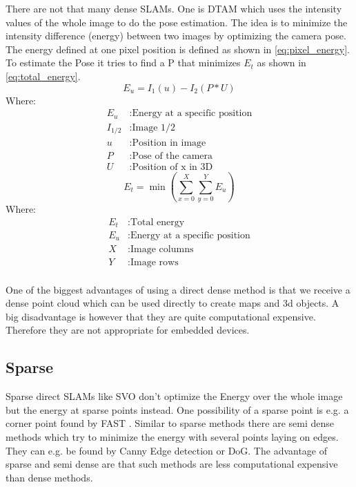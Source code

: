 \documentclass[11pt,a4paper,titlepage,oneside]{report}
\begin{document}
There are not that many dense SLAMs. One is DTAM \cite{dtam} which uses the intensity values of the whole image to do the pose estimation. The idea is to minimize the intensity difference (energy) between two images by optimizing the camera pose. The energy defined at one pixel position is defined as shown in \ref{eq:pixel_energy}. To estimate the Pose it tries to find a P that minimizes $E_{t}$ as shown in \ref{eq:total_energy}.
\begin{equation}\label{eq:pixel_energy}
  E_{u}=I_1(u)-I_2(P*U)
\end{equation}
Where:
\begin{align*}
  E_{u}		&: \text{Energy at a specific position}\\
  I_{1/2}	&: \text{Image 1/2}\\
  u		&: \text{Position in image} \\
  P		&: \text{Pose of the camera} \\
  U		&: \text{Position of x in 3D}
\end{align*}
\begin{equation}\label{eq:total_energy}
  E_{t}=\min(\sum_{x=0}^X\sum_{y=0}^YE_u)
\end{equation}
Where:
\begin{align*}
  E_{t}		&: \text{Total energy}\\
  E_{u}		&: \text{Energy at a specific position}\\
	X				&: \text{Image columns}\\
	Y				&: \text{Image rows}\\
\end{align*}


One of the biggest advantages of using a direct dense method is that we receive a dense point cloud which can be used directly to create maps and 3d objects. A big disadvantage is however that they are quite computational expensive. Therefore they are not appropriate for embedded devices.

\subsection{Sparse}

Sparse direct SLAMs like SVO \cite{svo} don't optimize the Energy over the whole image but the energy at sparse points instead. One possibility of a sparse point is e.g. a corner point found by FAST \cite{fast}. Similar to sparse methods there are semi dense methods which try to minimize the energy with several points laying on edges. They can e.g. be found by Canny Edge detection or DoG. The advantage of sparse and semi dense are that such methods are less computational expensive than dense methods.\\\\
\end{document}
